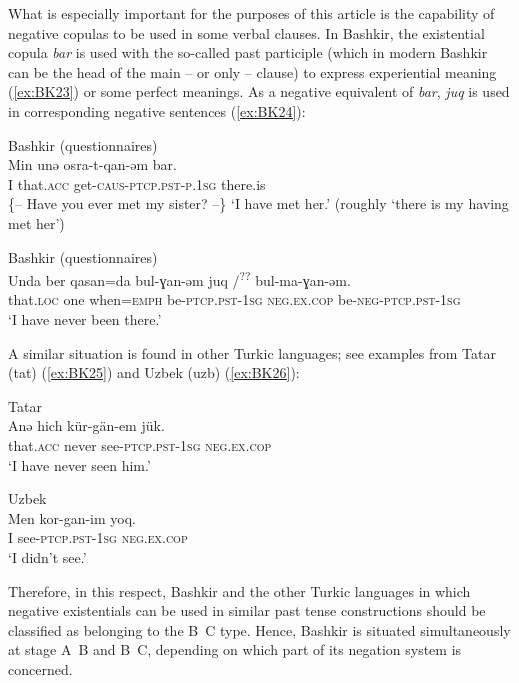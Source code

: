 \documentclass[output=paper]{langsci/langscibook}
\begin{document}
What is especially important for the purposes of this article is the capability of negative copulas to be used in some verbal clauses. In Bashkir, the existential copula \textit{bar} is used with the so-called past participle (which in modern Bashkir can be the head of the main – or only – clause) to express experiential meaning (\ref{ex:BK23}) or some perfect meanings. As a negative equivalent of \textit{bar}, \textit{juq} is used in corresponding negative sentences (\ref{ex:BK24}):

\ea Bashkir (questionnaires) \label{ex:BK23}\\
	\gll Min	unǝ		osra-t-qan-ǝm				bar.\\
	I		that.\textsc{acc}	get-\textsc{caus-ptcp.pst-p.1sg}	there.is\\
	\glt \{– Have you ever met my sister? –\} `I have met her.' (roughly `there is my having met her')
\z

\ea Bashkir (questionnaires) \label{ex:BK24}\\
	\gll Unda		ber	qasan=da		bul-ɣan-ǝm		juq {/\textsuperscript{??} bul-ma-ɣan-ǝm.}\\
	that.\textsc{loc}	one	when=\textsc{emph}	be-\textsc{ptcp.pst-1sg}	\textsc{neg.ex.cop}  be-\textsc{neg-ptcp.pst-1sg}\\
	\glt `I have never been there.'
\z

A similar situation is found in other Turkic languages; see examples from Tatar (tat) (\ref{ex:BK25}) and Uzbek (uzb) (\ref{ex:BK26}):

\ea Tatar \citep[126]{poppe1961a} \label{ex:BK25}\\
	\gll Anǝ		hich		kür-gän-em			jük.\\
	that.\textsc{acc}	never		see-\textsc{ptcp.pst-1sg}	\textsc{neg.ex.cop}\\
	\glt `I have never seen him.'\footnotemark
\z


\ea Uzbek \citep[123]{sjoberg1963a} \label{ex:BK26}\\
	\gll Men	kor-gan-im			yoq.\\
	I		see-\textsc{ptcp.pst-1sg}	\textsc{neg.ex.cop}\\
	\glt `I didn’t see.'
\z

Therefore, in this respect, Bashkir and the other Turkic languages in which negative existentials can be used in similar past tense constructions should be classified as belonging to the B~C type. Hence, Bashkir is situated simultaneously at stage A~B and B~C, depending on which part of its negation system is concerned.
\end{document}
